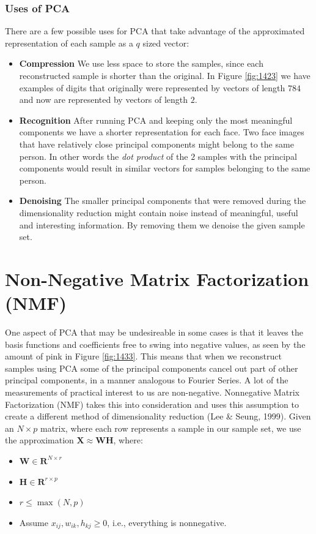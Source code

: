 \documentclass[a4paper]{article}
\begin{document}
\subsubsection{Uses of PCA}
There are a few possible uses for PCA that take advantage of the approximated representation of each sample as a $q$ sized vector:
\begin{itemize}

\item \textbf{Compression} We use less space to store the samples, since each reconstructed sample is shorter than the original. In Figure \ref{fig:1423} we have examples of digits that originally were represented by vectors of length $784$ and now are represented by vectors of length $2$.

\item \textbf{Recognition} After running PCA and keeping only the most meaningful components we have a shorter representation for each face. Two face images that have relatively close principal components might belong to the same person. In other words the \textit{dot product} of the $2$ samples with the principal components would result in similar vectors for samples belonging to the same person.

\item \textbf{Denoising} The smaller principal components that were removed during the dimensionality reduction might contain noise instead of meaningful, useful and interesting information. By removing them we denoise the given sample set.

\end{itemize} 

\section{Non-Negative Matrix Factorization (NMF)}
One aspect of PCA that may be undesireable in some cases is that it leaves the basis functions and coefficients free to swing into negative values, as seen by the amount of pink in Figure \ref{fig:1433}. This means that when we reconstruct samples using PCA some of the principal components cancel out part of other principal components, in a manner analogous to Fourier Series. A lot of the measurements of practical interest to us are non-negative. Nonnegative Matrix Factorization (NMF) takes this into consideration and uses this assumption to create a different method of dimensionality reduction (Lee \& Seung, 1999).
Given an $N\times p$ matrix, where each row represents a sample in our sample set, we use the approximation $\mathbf{X}\approx \mathbf{WH}$, where:
\begin{itemize}
\item $\mathbf{W}\in\mathbf{R}^{N\times r}$
\item $\mathbf{H}\in\mathbf{R}^{r\times p}$
\item $r \leq \max(N,p)$
\item Assume $x_{ij},w_{ik},h_{kj} \geq 0$, i.e., everything is nonnegative.
\end{itemize}
\end{document}
